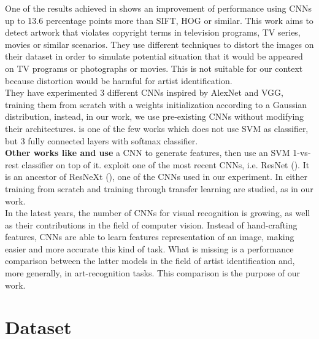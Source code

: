 \documentclass{article}
\begin{document}
One of the results achieved in \cite{hong2017} shows an improvement of performance using CNNs up to 13.6 percentage points more than SIFT, HOG or similar.  This work aims to detect artwork that violates copyright terms in television programs, TV series, movies or similar scenarios. They use different techniques to distort the images on their dataset in order to simulate potential situation that it would be appeared on TV programs or photographs or
movies. This is not suitable for our context because distortion would be harmful for artist identification.\\
They have experimented 3 different CNNs inspired by AlexNet and VGG, training them from scratch with a weights initialization according to a Gaussian distribution, instead, in our work, we use pre-existing CNNs without modifying their architectures. \cite{hong2017} is one of the few works which does not use SVM as classifier, but 3 fully connected layers with softmax classifier.\\
\textbf{Other works like \cite{Bar2014} and \cite{razavian2014} use} a CNN to generate features, then use an SVM 1-vs-rest classifier on top of it.
\cite{ArtistIdCNN406} exploit one of the most recent CNNs, i.e. ResNet (\cite{resnet}). It is an ancestor of ResNeXt (\cite{resneXt}), one of the CNNs used in our experiment. In \cite{ArtistIdCNN406} either training from scratch and training through transfer learning are studied,  as in our work.
\\

In the latest years, the number of CNNs for visual recognition is growing, as well as their contributions in the field of computer vision. Instead of hand-crafting features, CNNs are able to learn features representation of an image, making easier and more accurate this kind of task. What is missing is a performance comparison between the latter models in the field of artist identification and, more generally, in art-recognition tasks. This comparison is the purpose of our work.


\section{Dataset}\label{dataset}
\end{document}
